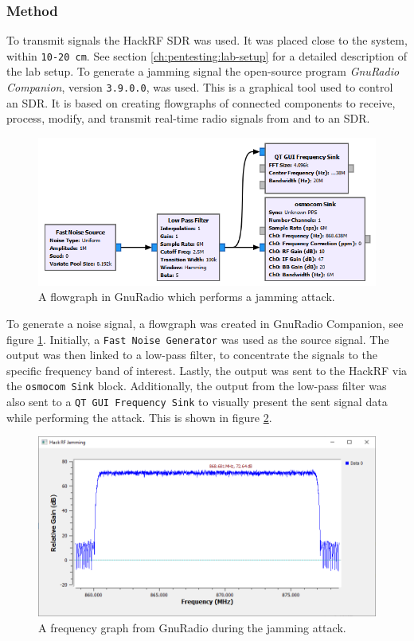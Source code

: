 \subsubsection{Method}
To transmit signals the HackRF SDR was used. It was placed close to the system, within \texttt{10-20 cm}. See section \ref{ch:pentesting:lab-setup} for a detailed description of the lab setup. To generate a jamming signal the open-source program \textit{GnuRadio Companion}, version \texttt{3.9.0.0}, was used. This is a graphical tool used to control an SDR. It is based on creating flowgraphs of connected components to receive, process, modify, and transmit real-time radio signals from and to an SDR.
\begin{figure}[!ht]
    \centering
    \includegraphics[width=\textwidth]{images/6-pentesting/jamming-flowgraph.png}
    \caption{A flowgraph in GnuRadio which performs a jamming attack.}
    \label{fig:gnuradio-jamming-flowgraph}
\end{figure}
To generate a noise signal, a flowgraph was created in GnuRadio Companion, see figure \ref{fig:gnuradio-jamming-flowgraph}. Initially, a \texttt{Fast Noise Generator} was used as the source signal. The output was then linked to a low-pass filter, to concentrate the signals to the specific frequency band of interest. Lastly, the output was sent to the HackRF via the \texttt{osmocom Sink} block. Additionally, the output from the low-pass filter was also sent to a \texttt{QT GUI Frequency Sink} to visually present the sent signal data while performing the attack. This is shown in figure \ref{fig:gnuradio-frequency-graph}.
\begin{figure}[!ht]
    \centering
    \includegraphics[width=\textwidth]{images/6-pentesting/jamming-output-graph.png}
    \caption{A frequency graph from GnuRadio during the jamming attack.}
    \label{fig:gnuradio-frequency-graph}
\end{figure}

